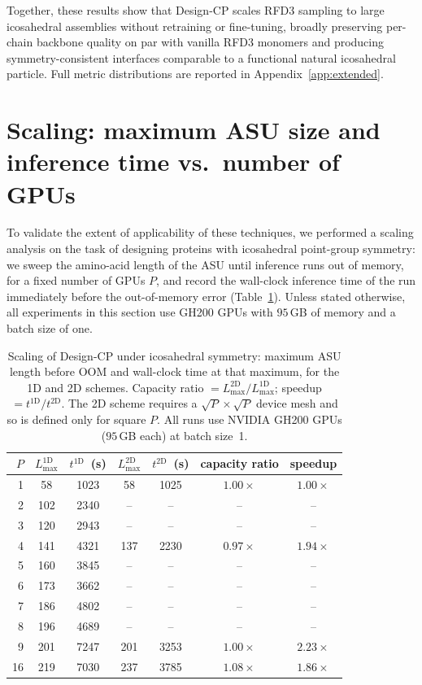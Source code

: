 Together, these results show that Design-CP scales RFD3 sampling to large
icosahedral assemblies without retraining or fine-tuning, broadly preserving
per-chain backbone quality on par with vanilla RFD3 monomers and producing
symmetry-consistent interfaces comparable to a functional natural icosahedral
particle. Full metric distributions are reported in
Appendix~\ref{app:extended}.

\section{Scaling: maximum ASU size and inference time vs.\ number of GPUs}
\label{sec:scaling}

To validate the extent of applicability of these techniques, we performed a
scaling analysis on the task of designing proteins with icosahedral point-group
symmetry: we sweep the amino-acid length of the ASU until inference runs out of
memory, for a fixed number of GPUs $P$, and record the wall-clock inference time
of the run immediately before the out-of-memory error
(Table~\ref{tab:scaling}). Unless stated otherwise, all experiments in this
section use GH200 GPUs with $95\,$GB of memory and a batch size of one.

\begin{table}[t]
  \centering
  \caption{Scaling of Design-CP under icosahedral symmetry: maximum ASU length
    before OOM and wall-clock time at that maximum, for the 1D and 2D schemes.
    Capacity ratio $=L^{\text{2D}}_{\max}/L^{\text{1D}}_{\max}$; speedup
    $=t^{\text{1D}}/t^{\text{2D}}$. The 2D scheme requires a
    $\sqrt{P}\times\sqrt{P}$ device mesh and so is defined only for square $P$.
    All runs use NVIDIA GH200 GPUs ($95\,$GB each) at batch size~1.}%
  \label{tab:scaling}
  \begin{tabular}{@{}rcccccc@{}}
    \toprule
    $P$ & $L^{\text{1D}}_{\max}$ & $t^{\text{1D}}$~(s) & $L^{\text{2D}}_{\max}$ &
    $t^{\text{2D}}$~(s) & capacity ratio & speedup \\
    \midrule
    1  & 58  & 1023 & 58  & 1025 & $1.00\times$ & $1.00\times$ \\
    2  & 102 & 2340 & --  & --   & --           & --           \\
    3  & 120 & 2943 & --  & --   & --           & --           \\
    4  & 141 & 4321 & 137 & 2230 & $0.97\times$ & $1.94\times$ \\
    5  & 160 & 3845 & --  & --   & --           & --           \\
    6  & 173 & 3662 & --  & --   & --           & --           \\
    7  & 186 & 4802 & --  & --   & --           & --           \\
    8  & 196 & 4689 & --  & --   & --           & --           \\
    9  & 201 & 7247 & 201 & 3253 & $1.00\times$ & $2.23\times$ \\
    16 & 219 & 7030 & 237 & 3785 & $1.08\times$ & $1.86\times$ \\
    \bottomrule
  \end{tabular}
\end{table}

